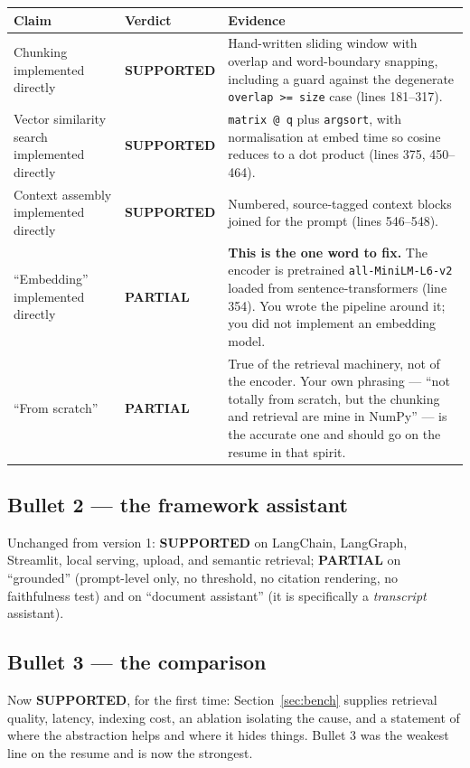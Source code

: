 \documentclass[11pt,a4paper]{article}
\newcommand{\SUP}{\textcolor{supported}{\textbf{SUPPORTED}}}
\newcommand{\PART}{\textcolor{partial}{\textbf{PARTIAL}}}
\begin{document}
\begin{longtable}{@{}R{6.0cm}R{2.4cm}R{6.6cm}@{}}
\toprule
\textbf{Claim} & \textbf{Verdict} & \textbf{Evidence} \\
\midrule
\endhead
Chunking implemented directly & \SUP &
Hand-written sliding window with overlap and word-boundary snapping, including a
guard against the degenerate \texttt{overlap >= size} case (lines 181--317). \\
\addlinespace
Vector similarity search implemented directly & \SUP &
\texttt{matrix @ q} plus \texttt{argsort}, with normalisation at embed time so
cosine reduces to a dot product (lines 375, 450--464). \\
\addlinespace
Context assembly implemented directly & \SUP &
Numbered, source-tagged context blocks joined for the prompt (lines 546--548). \\
\addlinespace
``Embedding'' implemented directly & \PART &
\textbf{This is the one word to fix.} The encoder is pretrained
\texttt{all-MiniLM-L6-v2} loaded from sentence-transformers (line 354). You wrote
the pipeline around it; you did not implement an embedding model. \\
\addlinespace
``From scratch'' & \PART &
True of the retrieval machinery, not of the encoder. Your own phrasing --- ``not
totally from scratch, but the chunking and retrieval are mine in NumPy'' --- is
the accurate one and should go on the resume in that spirit. \\
\bottomrule
\end{longtable}

\subsection{Bullet 2 --- the framework assistant}

Unchanged from version 1: \SUP{} on LangChain, LangGraph, Streamlit, local
serving, upload, and semantic retrieval; \PART{} on ``grounded'' (prompt-level
only, no threshold, no citation rendering, no faithfulness test) and on
``document assistant'' (it is specifically a \emph{transcript} assistant).

\subsection{Bullet 3 --- the comparison}

Now \SUP, for the first time: Section~\ref{sec:bench} supplies retrieval quality,
latency, indexing cost, an ablation isolating the cause, and a statement of where
the abstraction helps and where it hides things. Bullet 3 was the weakest line on
the resume and is now the strongest.
\end{document}
